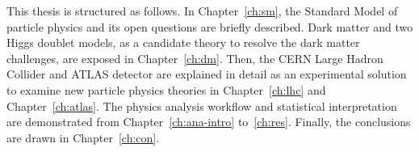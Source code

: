 \par This thesis is structured as follows. 
In Chapter~\ref{ch:sm}, the Standard Model of particle physics and its open questions are briefly described. Dark matter and two Higgs doublet models, as a candidate theory to resolve the dark matter challenges, are exposed in Chapter~\ref{ch:dm}. 
Then, the CERN Large Hadron Collider and ATLAS detector are explained in detail as an experimental solution to examine new particle physics theories in Chapter~\ref{ch:lhc} and Chapter~\ref{ch:atlas}. 
The physics analysis workflow and statistical interpretation are demonstrated from Chapter~\ref{ch:ana-intro} to~\ref{ch:res}. 
Finally, the conclusions are drawn in Chapter~\ref{ch:con}.
